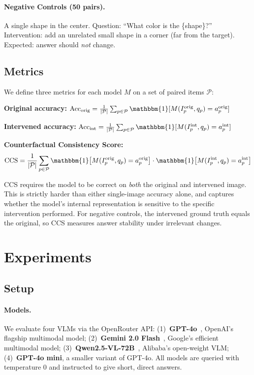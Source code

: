 \documentclass[10pt,twocolumn,letterpaper]{article}
\newcommand{\ccs}{CCS\xspace}
\begin{document}
\paragraph{Negative Controls (50 pairs).} A single shape in the center. Question: ``What color is the \{shape\}?'' Intervention: add an unrelated small shape in a corner (far from the target). Expected: answer should \emph{not} change.

\subsection{Metrics}

We define three metrics for each model $M$ on a set of paired items $\mathcal{P}$:

\textbf{Original accuracy:} $\text{Acc}_\text{orig} = \frac{1}{|\mathcal{P}|}\sum_{p \in \mathcal{P}} \mathbbm{1}[M(I_p^\text{orig}, q_p) = a_p^\text{orig}]$

\textbf{Intervened accuracy:} $\text{Acc}_\text{int} = \frac{1}{|\mathcal{P}|}\sum_{p \in \mathcal{P}} \mathbbm{1}[M(I_p^\text{int}, q_p) = a_p^\text{int}]$

\textbf{Counterfactual Consistency Score:}
\begin{equation}
\text{CCS} = \frac{1}{|\mathcal{P}|}\sum_{p \in \mathcal{P}} \mathbbm{1}\big[M(I_p^\text{orig}, q_p) = a_p^\text{orig}\big] \cdot \mathbbm{1}\big[M(I_p^\text{int}, q_p) = a_p^\text{int}\big]
\label{eq:ccs}
\end{equation}

\ccs requires the model to be correct on \emph{both} the original and intervened image. This is strictly harder than either single-image accuracy alone, and captures whether the model's internal representation is sensitive to the specific intervention performed. For negative controls, the intervened ground truth equals the original, so \ccs measures answer stability under irrelevant changes.

\section{Experiments}
\label{sec:experiments}

\subsection{Setup}

\paragraph{Models.} We evaluate four VLMs via the OpenRouter API: (1)~\textbf{GPT-4o}~\cite{achiam2023gpt4}, OpenAI's flagship multimodal model; (2)~\textbf{Gemini 2.0 Flash}~\cite{team2024gemini}, Google's efficient multimodal model; (3)~\textbf{Qwen2.5-VL-72B}~\cite{bai2025qwen25vl}, Alibaba's open-weight VLM; (4)~\textbf{GPT-4o mini}, a smaller variant of GPT-4o. All models are queried with temperature 0 and instructed to give short, direct answers.
\end{document}
